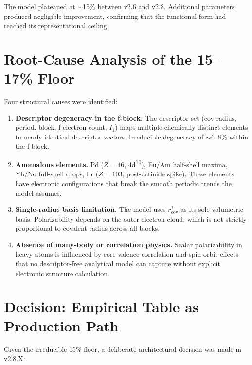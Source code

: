 \documentclass[11pt,a4paper]{article}
\begin{document}
\noindent The model plateaued at \(\sim\)15\% between v2.6 and v2.8.
Additional parameters produced negligible improvement, confirming that the
functional form had reached its representational ceiling.

\section{Root-Cause Analysis of the 15--17\% Floor}

Four structural causes were identified:

\begin{enumerate}
  \item \textbf{Descriptor degeneracy in the f-block.}
    The descriptor set (cov-radius, period, block, f-electron count, $I_1$)
    maps multiple chemically distinct elements to nearly identical descriptor
    vectors. Irreducible degeneracy of \(\sim\)6--8\% within the f-block.

  \item \textbf{Anomalous elements.}
    Pd ($Z=46$, 4d\textsuperscript{10}), Eu/Am half-shell maxima,
    Yb/No full-shell drops, Lr ($Z=103$, post-actinide spike).
    These elements have electronic configurations that break the smooth
    periodic trends the model assumes.

  \item \textbf{Single-radius basis limitation.}
    The model uses $r_\mathrm{cov}^3$ as its sole volumetric basis.
    Polarizability depends on the outer electron cloud, which is not
    strictly proportional to covalent radius across all blocks.

  \item \textbf{Absence of many-body or correlation physics.}
    Scalar polarizability in heavy atoms is influenced by core-valence
    correlation and spin-orbit effects that no descriptor-free analytical
    model can capture without explicit electronic structure calculation.
\end{enumerate}

\section{Decision: Empirical Table as Production Path}

Given the irreducible 15\% floor, a deliberate architectural decision was
made in v2.8.X:
\end{document}
